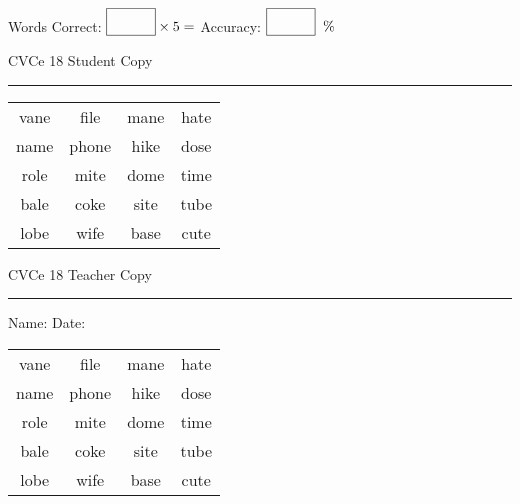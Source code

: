 \documentclass{memoir}
\begin{document}
\small

Words Correct: $\fbox{\phantom{\huge 100}} \times 5 = $ Accuracy: $\fbox{\phantom{\huge 100}}\;\; \%$ 

\vfill

\newpage


\footnotesize \noindent
CVCe 18 \hfill Student Copy
\smallskip
\hrule

\Large

\setlength{\tabcolsep}{14pt}
\def\arraystretch{2}

{\selectfont


\begin{vplace}[0.5]
\begin{center}
\begin{tabular}{cccc}
vane & file & mane & hate \\
name & phone & hike & dose \\
role & mite & dome & time \\
bale & coke & site & tube \\
lobe & wife & base & cute \\
\end{tabular}
\end{center}
\end{vplace}

}

\newpage

\footnotesize \noindent
CVCe 18 \hfill Teacher Copy
\smallskip
\hrule

\small

\vfill

\noindent
Name: \underline{\hspace{1.75in}} \hfill Date: \underline{\hspace{1in}}

\Large

{\selectfont


\begin{vplace}[0.5]
\begin{center}
\begin{tabular}{cccc}
vane & file & mane & hate \\
name & phone & hike & dose \\
role & mite & dome & time \\
bale & coke & site & tube \\
lobe & wife & base & cute \\
\end{tabular}
\end{center}
\end{vplace}



}
\end{document}
